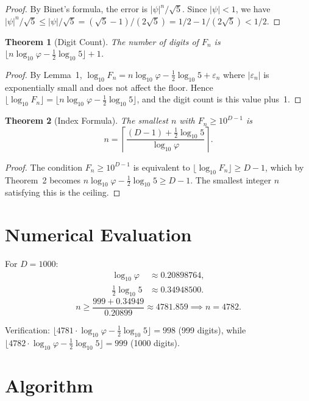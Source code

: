 \documentclass[12pt,a4paper]{article}
\newtheorem{theorem}{Theorem}
\theoremstyle{definition}
\begin{document}
\begin{proof}
By Binet's formula, the error is $|\psi|^n/\sqrt{5}$. Since $|\psi| < 1$, we have $|\psi|^n/\sqrt{5} \leq |\psi|/\sqrt{5} = (\sqrt{5}-1)/(2\sqrt{5}) = 1/2 - 1/(2\sqrt{5}) < 1/2$.
\end{proof}

\begin{theorem}[Digit Count]
The number of digits of $F_n$ is $\lfloor n\log_{10}\varphi - \frac{1}{2}\log_{10}5 \rfloor + 1$.
\end{theorem}

\begin{proof}
By Lemma~1, $\log_{10} F_n = n\log_{10}\varphi - \frac{1}{2}\log_{10}5 + \varepsilon_n$ where $|\varepsilon_n|$ is exponentially small and does not affect the floor. Hence $\lfloor\log_{10} F_n\rfloor = \lfloor n\log_{10}\varphi - \frac{1}{2}\log_{10}5 \rfloor$, and the digit count is this value plus~1.
\end{proof}

\begin{theorem}[Index Formula]
The smallest $n$ with $F_n \geq 10^{D-1}$ is
\[
n = \left\lceil \frac{(D-1) + \frac{1}{2}\log_{10}5}{\log_{10}\varphi} \right\rceil.
\]
\end{theorem}

\begin{proof}
The condition $F_n \geq 10^{D-1}$ is equivalent to $\lfloor\log_{10} F_n\rfloor \geq D-1$, which by Theorem~2 becomes $n\log_{10}\varphi - \frac{1}{2}\log_{10}5 \geq D-1$. The smallest integer $n$ satisfying this is the ceiling.
\end{proof}

\section{Numerical Evaluation}

For $D = 1000$:
\begin{align}
\log_{10}\varphi &\approx 0.20898764, \\
\tfrac{1}{2}\log_{10}5 &\approx 0.34948500.
\end{align}
\[
n \geq \frac{999 + 0.34949}{0.20899} \approx 4781.859 \implies n = 4782.
\]

Verification: $\lfloor 4781 \cdot \log_{10}\varphi - \tfrac{1}{2}\log_{10}5\rfloor = 998$ (999 digits), while $\lfloor 4782 \cdot \log_{10}\varphi - \tfrac{1}{2}\log_{10}5\rfloor = 999$ (1000 digits).

\section{Algorithm}
\end{document}
